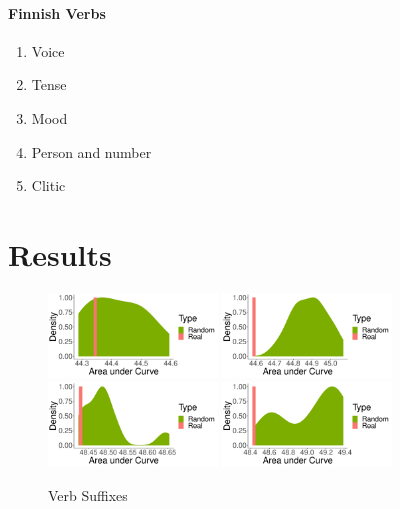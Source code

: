 \documentclass[11pt,letterpaper]{article}
\begin{document}
\paragraph{Finnish Verbs}
\begin{enumerate}
    \item Voice
    \item Tense 
    \item Mood 
    \item Person and number
    \item Clitic
\end{enumerate}



\section{Results}


\begin{figure}
    \centering
        \includegraphics[width=0.4\textwidth]{figures/finnish_verbs/suffixes-byMorphemes-auc-hist-heldout-Coarse-FineSurprisal-optimized.pdf}
    \includegraphics[width=0.4\textwidth]{figures/turkish_verbs/suffixes-byMorphemes-auc-hist-heldout-Coarse-FineSurprisal-optimized.pdf}
    \includegraphics[width=0.4\textwidth]{figures/hungarian_verbs/suffixes-byMorphemes-auc-hist-heldout-Coarse-FineSurprisal-optimized.pdf}
    \includegraphics[width=0.4\textwidth]{figures/korean/suffixes-byMorphemes-auc-hist-heldout-Coarse-FineSurprisal-optimized.pdf}
    \caption{Verb Suffixes}
    \label{fig:my-label}
\end{figure}
\end{document}
